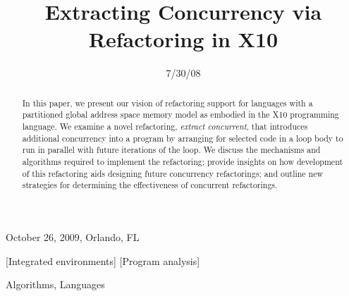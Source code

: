 \documentclass[natbib]{sigplanconf}
\begin{document}
 {October 26, 2009, Orlando, FL}

\title{Extracting Concurrency via Refactoring in X10}




\date{7/30/08}

\maketitle

\begin{abstract}
In this paper, we present our vision of refactoring 
support for languages with a partitioned global address space memory model as 
embodied in the X10 programming language. We examine a novel refactoring, 
\emph{extract concurrent}, that introduces additional concurrency 
into a program by arranging for selected code in a loop body to run in parallel
with future iterations of the loop. We discuss the mechanisms and algorithms required
to implement the refactoring; provide insights on how development of this
refactoring aids designing future concurrency refactorings; and outline new
strategies for determining the effectiveness of concurrent refactorings.
\end{abstract}

[Integrated
environments]
[Program analysis]

\terms
Algorithms, Languages







\end{document}
